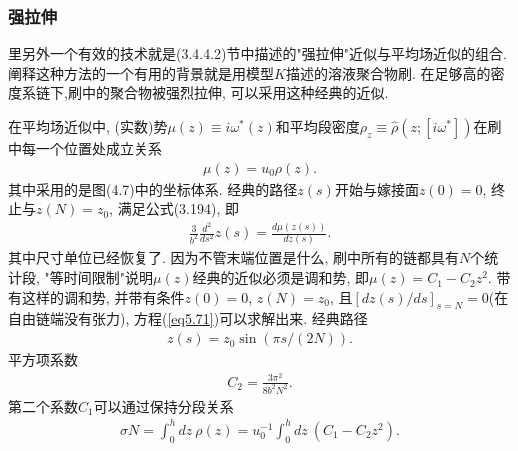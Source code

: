 \subsubsection{强拉伸}
里另外一个有效的技术就是(3.4.4.2)节中描述的"强拉伸"近似与平均场近似的组合.阐释这种方法的一个有用的背景就是用模型$K$描述的溶液聚合物刷.
在足够高的密度系链下,刷中的聚合物被强烈拉伸, 可以采用这种经典的近似.
\par
在平均场近似中, (实数)势$\mu(z)\equiv
i\omega^{*}(z)$和平均段密度$\rho_{z}\equiv \hat{\rho}(z;
[i\omega^{*}])$在刷中每一个位置处成立关系
\label{subsec.equations}
    \begin{equation}
        \begin{aligned}
          \mu(z)=u_{0}\rho(z).
        \end{aligned}
        \label{eq5.70}
    \end{equation}
其中采用的是图(4.7)中的坐标体系. 经典的路径$z(s)$开始与嫁接面$z(0)=0$,
终止与$z(N)=z_{0}$, 满足公式(3.194), 即
\label{subsec.equations}
    \begin{equation}
        \begin{aligned}
            \frac{3}{b^{2}}\frac{d^{2}}{ds^{2}}z(s)=\frac{d\mu(z(s))}{dz(s)}.
        \end{aligned}
        \label{eq5.71}
    \end{equation}
其中尺寸单位已经恢复了. 因为不管末端位置是什么, 刷中所有的链都具有$N$个统计段,
"等时间限制"说明$\mu(z)$经典的近似必须是调和势, 即$\mu(z)=C_{1}-C_{2}z^{2}$.
带有这样的调和势, 并带有条件$z(0)=0$, $z(N)=z_{0}$,
且$[dz(s)/ds]_{s=N}=0$(在自由链端没有张力), 方程(\ref{eq5.71})可以求解出来.
经典路径
\label{subsec.equations}
    \begin{equation}
        \begin{aligned}
            z(s)=z_{0}\sin(\pi s/(2N)).
        \end{aligned}
        \label{eq5.72}
    \end{equation}
平方项系数
\label{subsec.equations}
    \begin{equation}
        \begin{aligned}
            C_{2}=\frac{3\pi^{2}}{8b^{2}N^{2}}.
        \end{aligned}
        \label{eq5.73}
    \end{equation}
第二个系数$C_{1}$可以通过保持分段关系
\label{subsec.equations}
    \begin{equation}
        \begin{aligned}
            \sigma N=\int^{h}_{0}dz\ \rho(z)=u_{0}^{-1}\int^{h}_{0}dz\
            (C_{1}-C_{2}z^{2}).
        \end{aligned}
        \label{eq5.74}
    \end{equation}
